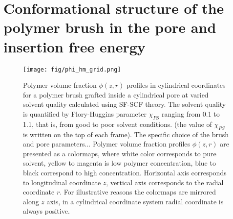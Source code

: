 \documentclass[12pt, a4paper]{article}
\begin{document}



\section{Conformational structure of the polymer brush in the pore and insertion free energy}



\begin{figure}
    \centering
    \texttt{[image: fig/phi\_hm\_grid.png]}
    \caption{
    Polymer volume fraction $\phi(z,r)$ profiles in cylindrical coordinates for a polymer brush grafted inside a cylindrical pore at varied solvent quality calculated using SF-SCF theory. 
    The solvent quality is quantified  by Flory-Huggins parameter $\chi_{PS}$ ranging from 0.1 to 1.1, that is, from good to poor solvent conditions.
    (the value of $\chi_{PS}$ is written on the top of each frame).
    The specific choice of the brush and pore parameters...
    Polymer volume fraction profiles $\phi(z,r)$ are presented as a colormaps, 
    where white color corresponds to pure solvent, yellow to magenta is low polymer concentration, blue to black correspond to high concentration.
    Horizontal axis corresponds to longitudinal coordinate $z$, vertical axis corresponds to the radial coordinate $r$.
    For illustrative reasons the colormaps are mirrored along $z$ axis, in a cylindrical coordinate system radial coordinate is always positive.
    }
    \label{fig:phi_hm_grid}
\end{figure}
\end{document}

